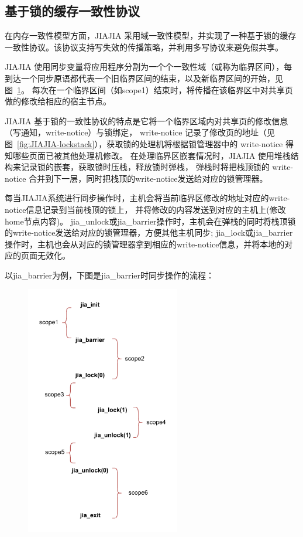 {    \subsection{基于锁的缓存一致性协议}
    在内存一致性模型方面，JIAJIA 采用域一致性模型，并实现了一种基于锁的缓存一致性协议。该协议支持写失效的传播策略，并利用多写协议来避免假共享。

    JIAJIA 使用同步变量将应用程序分割为一个个一致性域（或称为临界区间），每到达一个同步原语都代表一个旧临界区间的结束，以及新临界区间的开始，见图~\ref{fig:JIAJIA-scopes}。
    每次在一个临界区间（如scope1）结束时，将传播在该临界区中对共享页做的修改给相应的宿主节点。

    JIAJIA 基于锁的一致性协议的特点是它将一个临界区域内对共享页的修改信息（写通知，write-notice）与锁绑定，
    write-notice 记录了修改页的地址（见图~\ref{fig:JIAJIA-lockstack}），获取锁的处理机将根据锁管理器中的 write-notice 得知哪些页面已被其他处理机修改。
    在处理临界区嵌套情况时，JIAJIA 使用堆栈结构来记录锁的嵌套，获取锁时压栈，释放锁时弹栈，
    弹栈时将把栈顶锁的 write-notice 合并到下一层，同时把栈顶的write-notice发送给对应的锁管理器。

    每当JIAJIA系统进行同步操作时，主机会将当前临界区修改的地址对应的write-notice信息记录到当前栈顶的锁上，
    并将修改的内容发送到对应的主机上(修改home节点内容)。
    jia\_unlock或jia\_barrier操作时，主机会在弹栈的同时将栈顶锁的write-notice发送给对应的锁管理器，方便其他主机同步;
    jia\_lock或jia\_barrier操作时，主机也会从对应的锁管理器拿到相应的write-notice信息，并将本地的对应的页面无效化。

    以jia\_barrier为例，下图是jia\_barrier时同步操作的流程：

    \begin{figure}[!htbp]
        \centering
        \includegraphics[width=0.60\textwidth]{Img/JIAJIA一致性域.drawio.pdf}
        \label{fig:JIAJIA-scopes}
    \end{figure}

}

